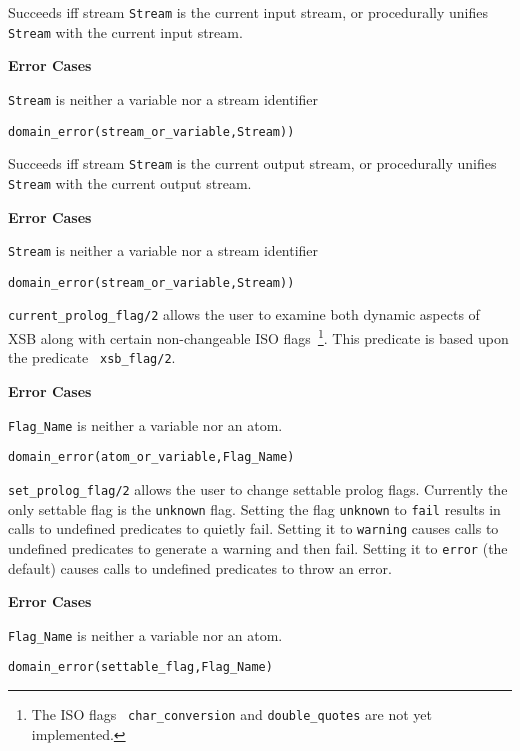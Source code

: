 \begin{description}

    Succeeds iff stream {\tt Stream} is the current input stream, or 
    procedurally unifies {\tt Stream} with the current input stream.

{\bf Error Cases}
\bi
\item 	{\tt Stream} is neither a variable nor a stream identifier
\bi
\item 	{\tt domain\_error(stream\_or\_variable,Stream))}
\ei
\ei

    Succeeds iff stream {\tt Stream} is the current output stream, or 
    procedurally unifies {\tt Stream} with the current output stream.

{\bf Error Cases}
\bi
\item 	{\tt Stream} is neither a variable nor a stream identifier
\bi
\item 	{\tt domain\_error(stream\_or\_variable,Stream))}
\ei
\ei

%
{\tt current\_prolog\_flag/2} allows the user to examine both dynamic
aspects of XSB along with certain non-changeable ISO
flags~\footnote{The ISO flags {\tt
char\_conversion} and {\tt double\_quotes} are not yet
implemented.}.  This predicate is based upon the predicate {\tt
xsb\_flag/2}.

{\bf Error Cases}
\bi
\item 	{\tt Flag\_Name} is neither a variable nor an atom.
\bi
\item 	{\tt domain\_error(atom\_or\_variable,Flag\_Name)}
\ei
\ei

%
{\tt set\_prolog\_flag/2} allows the user to change settable prolog
flags.  Currently the only settable flag is the {\tt unknown} flag.
Setting the flag {\tt unknown} to {\tt fail} results in calls to
undefined predicates to quietly fail.  Setting it to {\tt warning}
causes calls to undefined predicates to generate a warning and then
fail.  Setting it to {\tt error} (the default) causes calls to
undefined predicates to throw an error.

{\bf Error Cases}
\bi
\item 	{\tt Flag\_Name} is neither a variable nor an atom.
\bi
\item 	{\tt domain\_error(settable\_flag,Flag\_Name)}
\ei
\ei


\end{description}
